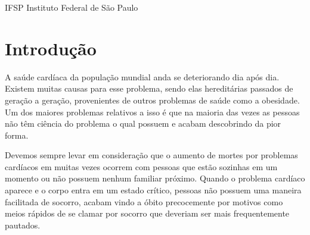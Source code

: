 \documentclass[
	12pt,				%
	openright,			%
	oneside,			%
	a4paper,			%
	english,			%
	french,				%
	spanish,			%
	brazil				%
]{abntex2}
\begin{document}
\listoffigures*
\cleardoublepage

\listoftables*
{}
\cleardoublepage

\begin{siglas}
  \item[IFSP] Instituto Federal de São Paulo
\end{siglas}



\tableofcontents*
\cleardoublepage



\textual

\chapter{Introdução}

A saúde cardíaca da população mundial anda se deteriorando dia após dia. Existem muitas causas para esse problema, sendo elas hereditárias passados de geração a geração, provenientes de outros problemas de saúde como a obesidade. Um dos maiores problemas relativos a isso é que na maioria das vezes as pessoas não têm ciência do problema o qual possuem e acabam descobrindo da pior forma.

Devemos sempre levar em consideração que o aumento de mortes por problemas cardíacos em muitas vezes ocorrem com pessoas que estão sozinhas em um momento ou não possuem nenhum familiar próximo. Quando o problema cardíaco aparece e o corpo entra em um estado crítico, pessoas não possuem uma maneira facilitada de socorro, acabam vindo a óbito precocemente por motivos como meios rápidos de se clamar por socorro que deveriam ser mais frequentemente pautados.
\end{document}
